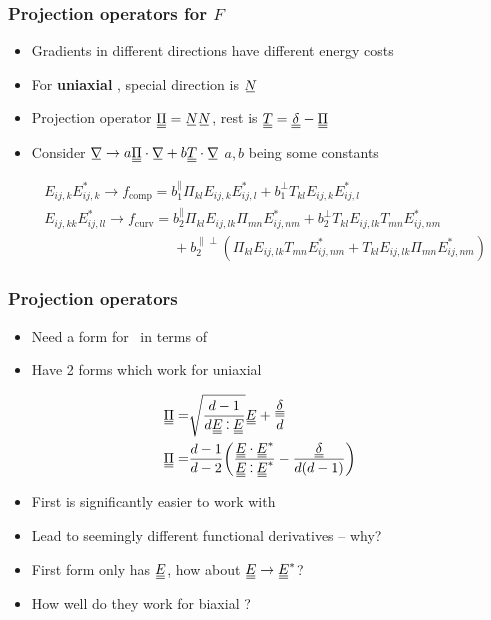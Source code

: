 \documentclass[10pt,mathserif]{beamer}
\begin{document}
\begin{frame}
    \frametitle{Projection operators for $F$}
    \begin{itemize}
        \item Gradients in different directions have different energy costs
        \item For \textbf{uniaxial} \EE, special direction is $\su{N}$
        \item Projection operator $\du{\Pi}=\su{N}\su{N}$, rest is $\du{T} = \du{\delta} - \du{\Pi}$
        \item Consider $\su{\nabla} \rightarrow a \du{\Pi}\cdot\su{\nabla} + b \du{T}\cdot\su{\nabla}$ \color{gray} $a, b$ being some constants \normalcolor
    \end{itemize}

    \begin{align*}
        &E_{ij,k}E_{ij,k}^* \rightarrow f_\text{comp} = b_1^\parallel \Pi_{kl} E_{ij,k}E_{ij,l}^* + b_1^\perp T_{kl} E_{ij,k}E_{ij,l}^* \\
        &E_{ij,kk}E_{ij,ll}^* \rightarrow f_\text{curv} = b_2^\parallel \Pi_{kl}E_{ij,lk}\Pi_{mn}E_{ij,nm}^* + b_2^\perp T_{kl}E_{ij,lk}T_{mn}E_{ij,nm}^* \\
        &\phantom{E_{ij,kk}E_{ij,ll}^* \rightarrow f_\text{curv} =}+ b_2^{\parallel\perp}(\Pi_{kl}E_{ij,lk}T_{mn}E_{ij,nm}^* + T_{kl}E_{ij,lk}\Pi_{mn}E_{ij,nm}^*)
    \end{align*}
\end{frame}

\begin{frame}
    \frametitle{Projection operators}
    \begin{itemize}
        \item Need a form for \PP\ in terms of \EE
        \item Have 2 forms which work for uniaxial \EE
    \end{itemize}
    \begin{align*}
        \du{\Pi} =& \sqrt{\frac{d-1}{d \du{E} \cddot \du{E}}} \du{E} + \frac{\du{\delta}}{d} \\
        \du{\Pi} =& \frac{d-1}{d-2}\qty(\frac{\du{E} \cdot \du{E}^*}{\du{E} \cddot \du{E}^*} - \frac{\du{\delta}}{d(d-1)})
    \end{align*}
    \begin{itemize}
        \item First is significantly easier to work with
        \color{gray}
        \item Lead to seemingly different functional derivatives -- why?
        \item First form only has $\du{E}$, how about $\du{E} \rightarrow \du{E}^*$?
        \item How well do they work for biaxial \EE?
        \normalcolor
    \end{itemize}
\end{frame}
\end{document}
